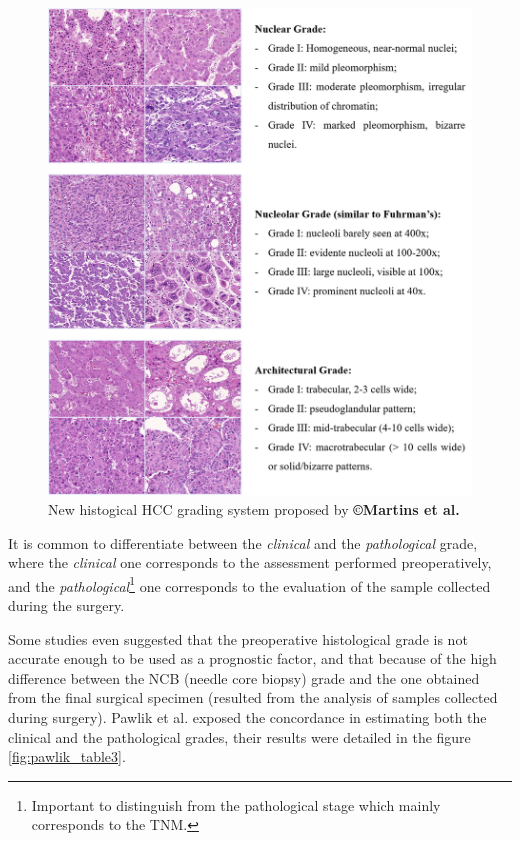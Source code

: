 \begin{figure}[th!]
\centering
\includegraphics[width=0.9\linewidth]{images/martins2017_fig5}
\caption{New histogical HCC grading system proposed by \textbf{©Martins et al. \cite{Martins2017}}}
\label{fig:martins2017_fig5}
\end{figure}


It is common to differentiate between the \emph{clinical} and the
\emph{pathological} grade, where the \emph{clinical} one corresponds to the assessment
performed preoperatively, and the \emph{pathological}\footnote{Important to distinguish from the pathological stage which mainly corresponds to the TNM.} one corresponds to the evaluation
of the sample collected during the surgery.

Some studies even suggested that the preoperative histological grade is
not accurate enough to be used as a prognostic factor, and that because
of the high difference between the NCB (needle core biopsy) grade and the
one obtained from the final surgical specimen (resulted from the
analysis of samples collected during surgery). Pawlik et al.
exposed the concordance in estimating both the clinical and the pathological grades, their results were detailed in the figure \ref{fig:pawlik_table3}.

